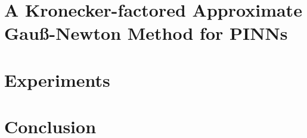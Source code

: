 \documentclass{article}
\begin{document}
\section{A Kronecker-factored Approximate Gauß-Newton Method for PINNs}\label{sec:kfac_pinns}




\section{Experiments}\label{sec:experiments}



\section{Conclusion}







\clearpage
\appendix


\end{document}
